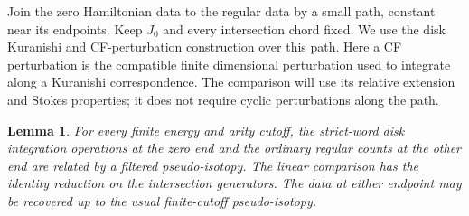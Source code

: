 \documentclass[11pt]{article}
\numberwithin{equation}{section}
\newtheorem{lemma}[theorem]{Lemma}
\theoremstyle{definition}
\theoremstyle{remark}
\begin{document}
Join the zero Hamiltonian data to the regular data by a small path,
constant near its endpoints.  Keep $J_0$ and every intersection chord
fixed.  We use the disk Kuranishi and CF-perturbation construction
over this path.  Here a CF perturbation is the compatible finite
dimensional perturbation used to integrate along a Kuranishi
correspondence.  The comparison will use its relative extension and
Stokes properties; it does not require cyclic perturbations along
the path.

\begin{lemma}
\label{comp:pseudoisotopy}
For every finite energy and arity cutoff, the strict-word disk
integration operations at the zero end and the ordinary regular
counts at the other end are related by a filtered pseudo-isotopy.
The linear comparison has the identity reduction on the
intersection generators.  The data at either endpoint may be
recovered up to the usual finite-cutoff pseudo-isotopy.
\end{lemma}
\end{document}
